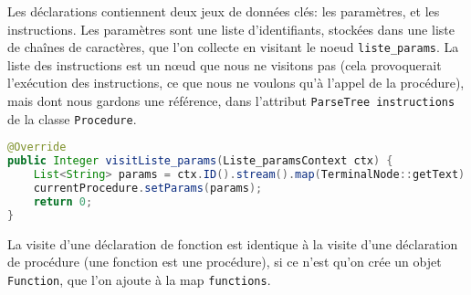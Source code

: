\documentclass[a4paper,11pt]{article}
\begin{document}
Les déclarations contiennent deux jeux de données clés: les paramètres, et les instructions. Les paramètres sont une liste d'identifiants, stockées dans une liste de chaînes de caractères, que l'on collecte en visitant le noeud \lstinline$liste_params$. La liste des instructions est un nœud que nous ne visitons pas (cela provoquerait l'exécution des instructions, ce que nous ne voulons qu'à l'appel de la procédure), mais dont nous gardons une référence, dans l'attribut \lstinline$ParseTree instructions$ de la classe \lstinline$Procedure$.

\begin{lstlisting}[language=Java]
@Override
public Integer visitListe_params(Liste_paramsContext ctx) {
    List<String> params = ctx.ID().stream().map(TerminalNode::getText).collect(Collectors.toList());
    currentProcedure.setParams(params);
    return 0;
}
\end{lstlisting}

La visite d'une déclaration de fonction est identique à la visite d'une déclaration de procédure (une fonction est une procédure), si ce n'est qu'on crée un objet \lstinline$Function$, que l'on ajoute à la map \lstinline$functions$.


\end{document}
